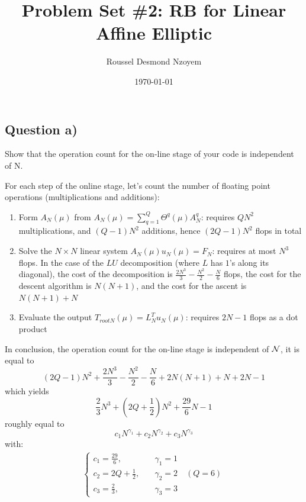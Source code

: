 \documentclass[
	english,
	11pt, %
]{fphw}
\title{Problem Set \#2: RB for Linear Affine Elliptic} %
\author{Roussel Desmond Nzoyem} %
\date{\today} %
\institute{University of Strasbourg \\ UFR de Mathématiques et Informatique} %
\begin{document}
\maketitle %




\subsection*{Question a)}
\begin{problem}
	Show that the operation count for the on-line stage of your code is independent of N.
\end{problem}

For each step of the online stage, let's count the number of floating point operations (multiplications and additions):
\begin{enumerate}
	\item Form $A_N(\mu)$ from $A_N(\mu)=\sum_{q=1}^Q \Theta^q(\mu)A_N^q$: requires $QN^2$ multiplications, and $(Q-1)N^2$ additions, hence $(2Q-1)N^2$ flops in total
	\item Solve the $N\times N$ linear system $A_N(\mu)u_N(\mu)=F_N$: requires at most $N^3$ flops. In the case of the $LU$ decomposition (where $L$ has $1$'s along its diagonal), the cost of the decomposition is $\frac{2N^3}{3} - \frac{N^2}{2} - \frac{N}{6}$ flops, the cost for the descent algorithm is $N(N+1)$, and the cost for the ascent is $N(N+1)+N$
	\item Evaluate the output $T_{rootN}(\mu)=L_N^Tu_N(\mu)$: requires $2N-1$ flops as a dot product
\end{enumerate}
In conclusion, the operation count for the on-line stage is independent of $\cal{N}$, it is equal to $$(2Q-1)N^2+ \frac{2N^3}{3}-\frac{N^2}{2}-\frac{N}{6} +2N(N+1)+N + 2N-1$$ which yields $$\frac{2}{3}N^3 + (2Q+\frac{1}{2})N^2 + \frac{29}{6}N - 1 $$ roughly equal to $$c_1N^{\gamma_1}+c_2N^{\gamma_2}+c_3N^{\gamma_3}$$ with:
\begin{align*}
	\begin{cases}
		c_1 = \frac{29}{6}, &\quad \gamma_1=1 \\
		c_2 = 2Q+\frac{1}{2},&\quad \gamma_2 = 2 \quad (Q=6)\\
		c_3 = \frac{2}{3},&\quad \gamma_3 = 3
	\end{cases}
\end{align*}
\end{document}
